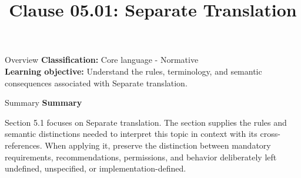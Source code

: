 \documentclass[10pt,letterpaper]{article}
\title{Clause 05.01: Separate Translation}
\author{}
\date{}
\begin{document}
\maketitle
\begin{CornellOverviewBox}{Overview}
\textbf{Classification:} Core language - Normative\\[2pt]
\textbf{Learning objective:} Understand the rules, terminology, and semantic consequences associated with Separate translation.
\end{CornellOverviewBox}\begin{CornellSummaryBox}{Summary}
{\sffamily\bfseries\color{Accent} Summary}\par\vspace{3pt}Section 5.1 focuses on Separate translation. The section supplies the rules and semantic distinctions needed to interpret this topic in context with its cross-references. When applying it, preserve the distinction between mandatory requirements, recommendations, permissions, and behavior deliberately left undefined, unspecified, or implementation-defined.
\end{CornellSummaryBox}
\end{document}
